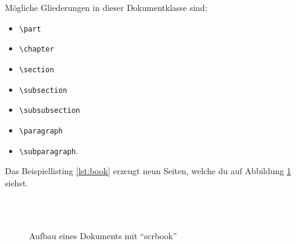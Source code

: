 Mögliche Gliederungen in dieser Dokumentklasse sind:
\begin{itemize}
	\item \texttt{\textbackslash part}
	\item \texttt{\textbackslash chapter}
	\item \texttt{\textbackslash section}
	\item \texttt{\textbackslash subsection}
	\item \texttt{\textbackslash subsubsection}
	\item \texttt{\textbackslash paragraph}
	\item \texttt{\textbackslash subparagraph}.
\end{itemize}

Das Beispiellisting \ref{lst:book} erzeugt neun Seiten, welche du auf Abbildung \ref{fig:book} siehst.

\begin{figure}[htb]
	\begin{center}
		 \\
		 \\
	\end{center}
	\caption{Aufbau eines Dokuments mit \enquote{scrbook}}
	\label{fig:book}
\end{figure}

%
%
